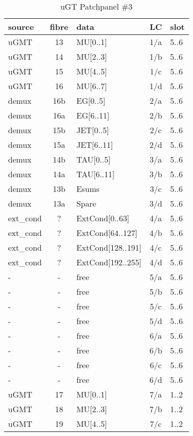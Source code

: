 \begin{longtable}{|l|c|l|c|l|}
\caption{uGT Patchpanel \#3}
    \label{tab:app:ugt_opt_pp_2}\\
\hline
\textbf{source}& \textbf{fibre}& \textbf{data}& \textbf{LC}& \textbf{slot}\\
\hline
\hline
\endhead
uGMT  & 13  & MU[0..1]   & 1/a  & 5..6 \\\hline
uGMT  & 14  & MU[2..3]   & 1/b  & 5..6 \\\hline
uGMT  & 15  & MU[4..5]   & 1/c  & 5..6 \\\hline
uGMT  & 16  & MU[6..7]   & 1/d  & 5..6 \\\hline
demux & 16b & EG[0..5]   & 2/a  & 5..6 \\\hline
demux & 16a & EG[6..11]  & 2/b  & 5..6 \\\hline
demux & 15b & JET[0..5]  & 2/c  & 5..6 \\\hline
demux & 15a & JET[6..11] & 2/d  & 5..6 \\\hline
demux & 14b & TAU[0..5]  & 3/a  & 5..6 \\\hline
demux & 14a & TAU[6..11] & 3/b  & 5..6 \\\hline
demux & 13b & Esums      & 3/c  & 5..6 \\\hline
demux & 13a & Spare      & 3/d  & 5..6 \\\hline
ext\_cond & ?   & ExtCond[0..63]    & 4/a  & 5..6 \\\hline
ext\_cond & ?   & ExtCond[64..127]  & 4/b  & 5..6 \\\hline
ext\_cond & ?   & ExtCond[128..191] & 4/c  & 5..6 \\\hline
ext\_cond & ?   & ExtCond[192..255] & 4/d  & 5..6 \\\hline
- & - & free & 5/a  & 5..6 \\\hline
- & - & free & 5/b  & 5..6 \\\hline
- & - & free & 5/c  & 5..6 \\\hline
- & - & free & 5/d  & 5..6 \\\hline
- & - & free & 6/a  & 5..6 \\\hline
- & - & free & 6/b  & 5..6 \\\hline
- & - & free & 6/c  & 5..6 \\\hline
- & - & free & 6/d  & 5..6 \\\hline
\hline
uGMT  & 17  & MU[0..1]   & 7/a  & 1..2 \\\hline
uGMT  & 18  & MU[2..3]   & 7/b  & 1..2 \\\hline
uGMT  & 19  & MU[4..5]   & 7/c  & 1..2 \\\hline

\end{longtable}

